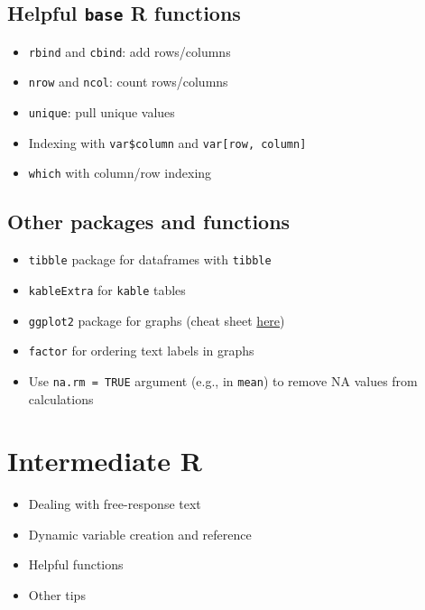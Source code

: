 \documentclass[
]{book}
\providecommand{\tightlist}{%
  \setlength{\itemsep}{0pt}\setlength{\parskip}{0pt}}
\begin{document}
\hypertarget{helpful-base-r-functions}{%
\subsection{\texorpdfstring{Helpful \texttt{base} R functions}{Helpful base R functions}}\label{helpful-base-r-functions}}

\begin{itemize}
\tightlist
\item
  \texttt{rbind} and \texttt{cbind}: add rows/columns
\item
  \texttt{nrow} and \texttt{ncol}: count rows/columns
\item
  \texttt{unique}: pull unique values
\item
  Indexing with \texttt{var\$column} and \texttt{var{[}row,\ column{]}}
\item
  \texttt{which} with column/row indexing
\end{itemize}

\hypertarget{other-packages-and-functions}{%
\subsection{Other packages and functions}\label{other-packages-and-functions}}

\begin{itemize}
\tightlist
\item
  \texttt{tibble} package for dataframes with \texttt{tibble}
\item
  \texttt{kableExtra} for \texttt{kable} tables
\item
  \texttt{ggplot2} package for graphs (cheat sheet \href{https://github.com/rstudio/cheatsheets/blob/master/data-visualization-2.1.pdf}{here})
\item
  \texttt{factor} for ordering text labels in graphs
\item
  Use \texttt{na.rm\ =\ TRUE} argument (e.g., in \texttt{mean}) to remove NA values from calculations
\end{itemize}

\hypertarget{intermediate-r}{%
\section{Intermediate R}\label{intermediate-r}}

\begin{itemize}
\tightlist
\item
  Dealing with free-response text
\item
  Dynamic variable creation and reference
\item
  Helpful functions
\item
  Other tips
\end{itemize}
\end{document}
